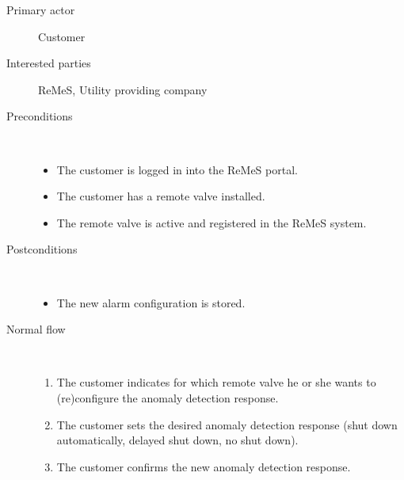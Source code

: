 \begin{description}
	\item[Primary actor] Customer
	\item[Interested parties] ReMeS, Utility providing company
	\item[Preconditions] \ 
	\begin{itemize}
		\item The customer is logged in into the ReMeS portal.
		\item The customer has a remote valve installed.
		\item The remote valve is active and registered in the ReMeS system.
	\end{itemize}
	\item[Postconditions] \ 
	\begin{itemize}
		\item The new alarm configuration is stored.
	\end{itemize}
	\item[Normal flow] \ 
	\begin{enumerate}
	  	\item The customer indicates for which remote valve he or she wants to
	  	(re)configure the anomaly detection response.
	  	\item The customer sets the desired anomaly detection response (shut down
	  	automatically, delayed shut down, no shut down).
	  	\item The customer confirms the new anomaly detection response.
	\end{enumerate}
\end{description}